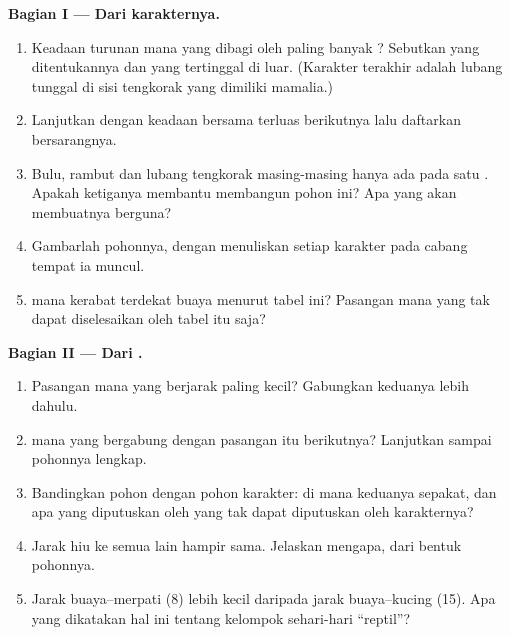 \begin{problem}
\medskip
\noindent\textbf{Bagian I --- Dari karakternya.}
\begin{enumerate}
  \item Keadaan turunan mana yang dibagi oleh paling banyak ?
        Sebutkan  yang ditentukannya dan  yang tertinggal
        di luar. (Karakter terakhir adalah lubang tunggal di sisi
        tengkorak yang dimiliki mamalia.)
  \item Lanjutkan dengan keadaan bersama terluas berikutnya lalu
        daftarkan  bersarangnya.
  \item Bulu, rambut dan lubang tengkorak masing-masing hanya ada pada
        satu . Apakah ketiganya membantu membangun pohon ini?
        Apa yang akan membuatnya berguna?
  \item Gambarlah pohonnya, dengan menuliskan setiap karakter pada
        cabang tempat ia muncul.
  \item {} mana kerabat terdekat buaya menurut tabel ini?
        Pasangan mana yang tak dapat diselesaikan oleh tabel itu saja?
\end{enumerate}

\medskip
\noindent\textbf{Bagian II --- Dari .}
\begin{enumerate}[resume]
  \item Pasangan  mana yang berjarak paling kecil? Gabungkan
        keduanya lebih dahulu.
  \item {} mana yang bergabung dengan pasangan itu berikutnya?
        Lanjutkan sampai pohonnya lengkap.
  \item Bandingkan pohon  dengan pohon karakter: di mana keduanya
        sepakat, dan apa yang diputuskan oleh  yang tak dapat
        diputuskan oleh karakternya?
  \item Jarak hiu ke semua  lain hampir sama. Jelaskan mengapa,
        dari bentuk pohonnya.
  \item Jarak buaya--merpati (8) lebih kecil daripada jarak
        buaya--kucing (15). Apa yang dikatakan hal ini tentang
        kelompok sehari-hari ``reptil''?
\end{enumerate}


\end{problem}
